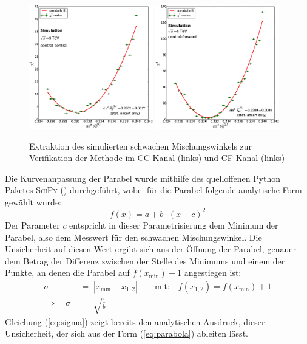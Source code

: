 \begin{figure}[h]
    \centering
    \includegraphics[width=0.48\textwidth]{plots/sin2theta_cc_closure}
    \hfill
    \includegraphics[width=0.48\textwidth]{plots/sin2theta_cf_closure}
    \caption[Extraktion des simulierten schwachen Mischungswinkels zur
        Verifikation der Methode]
        {Extraktion des simulierten schwachen Mischungswinkels zur
        Verifikation der Methode im \ac{CC}-Kanal (links) und \ac{CF}-Kanal
        (links)}
    \label{fig:closure}
\end{figure}

Die Kurvenanpassung der Parabel wurde mithilfe des quelloffenen Python Paketes
\textsc{SciPy} (\cite{scipy}) durchgeführt, wobei für die Parabel folgende
analytische Form gewählt wurde:
\begin{equation}
    f(x)=a+b\cdot(x-c)^2
    \label{eq:parabola}
\end{equation}
Der Parameter $c$ entspricht in dieser Parametrisierung dem Minimum der
Parabel, also dem Messwert für den schwachen Mischungswinkel. Die Unsicherheit
auf diesen Wert ergibt sich aus der Öffnung der Parabel, genauer dem Betrag der
Differenz zwischen der Stelle des Minimums und einem der Punkte, an denen die
Parabel auf $f(x_\text{min})+1$ angestiegen ist:
\begin{align}
    \sigma \;&=\; |x_\text{min} - x_{1,2}|
        \qquad \text{mit:} \quad f(x_{1,2}) = f(x_\text{min})+1
        \\[5pt]
    \Longrightarrow \quad \sigma \;&=\; \sqrt{\frac{1}{b}}
    \label{eq:sigma}
\end{align}
Gleichung (\ref{eq:sigma}) zeigt bereits den analytischen Ausdruck, dieser
Unsicherheit, der sich aus der Form (\ref{eq:parabola}) ableiten lässt.

